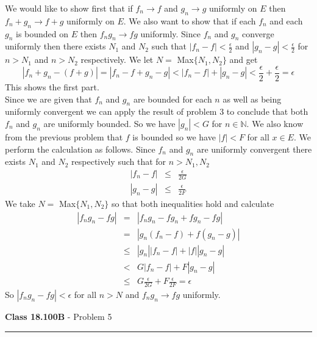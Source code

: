 \documentclass[11pt,reqno]{article}
\begin{document}
We would like to show first that if $f_n \to f$ and $g_n \to g$ uniformly on $E$ then $f_n + g_n \to f + g$ uniformly on $E$. We also want to show that if each $f_n$ and each $g_n$ is bounded on $E$ then $f_n g_n \to fg$ uniformly.
Since $f_n$ and $g_n$ converge uniformly then there exists $N_1$ and $N_2$ such that $|f_n - f | < \frac{\epsilon}{2}$ and $|g_n - g | < \frac{\epsilon}{2}$ for $n > N_1$ and $n > N_2$ respectively. We let $N = $ Max$\{N_1,N_2\}$ and get 
\[ |f_n + g_n - (f+g)| = |f_n - f + g_n - g| < |f_n - f| + |g_n - g| < \frac{\epsilon}{2} + \frac{\epsilon}{2} = \epsilon \]
This shows the first part.\\
\indent Since we are given that $f_n$ and $g_n$ are bounded for each $n$ as well as being uniformly convergent we can apply the result of problem 3 to conclude that both $f_n$ and $g_n$ are uniformly bounded. So we have $|g_n| < G$ for $n \in \mathbb{N}$. We also know from the previous problem that $f$ is bounded so we have $|f| < F$ for all $x \in E$. We perform the calculation as follows. Since $f_n$ and $g_n$ are uniformly convergent there exists $N_1$ and $N_2$ respectively such that for $n > N_1,N_2$
\begin{eqnarray*}
|f_n - f| &\le& \frac{\epsilon}{2G} \\
|g_n - g| &\le& \frac{\epsilon}{2F}
\end{eqnarray*}
We take $N = $ Max$\{ N_1, N_2\}$ so that both inequalities hold and calculate
\begin{eqnarray*}
 |f_n g_n - f g| &=& |f_n g_n - f g_n + f g_n - f g| \\
 		       &=& |g_n(f_n - f) + f (g_n - g)| \\ 
		       &\le&  |g_n||f_n - f| + |f||g_n-g| \\
		       &<& G|f_n - f| + F |g_n-g| \\
		       &\le& G \frac{\epsilon}{2G} + F \frac{\epsilon}{2F} = \epsilon
\end{eqnarray*}
So $ |f_n g_n - f g| < \epsilon $ for all $n > N$ and $f_n g_n \to fg$ uniformly.

\vspace{15pt}
\begin{flushleft} 
\textbf{Class 18.100B} - Problem 5\\
\rule{500pt}{1pt}\\
\end{flushleft} 
\end{document}
